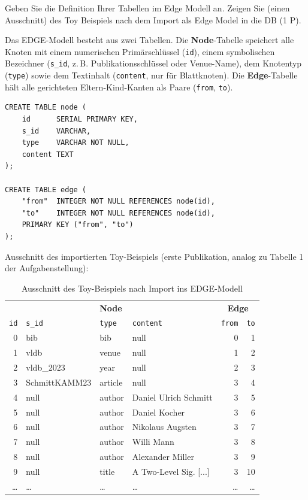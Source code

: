 \documentclass[11pt]{scrartcl}
\begin{document}
Geben Sie die Definition Ihrer Tabellen im Edge Modell an. Zeigen Sie (einen Ausschnitt) des Toy Beispiels nach dem Import als Edge Model in die DB (1 P).

Das EDGE-Modell besteht aus zwei Tabellen. Die \textbf{Node}-Tabelle speichert alle Knoten mit einem
numerischen Primärschlüssel (\texttt{id}), einem symbolischen Bezeichner (\texttt{s\_id}, z.\,B.
Publikationsschlüssel oder Venue-Name), dem Knotentyp (\texttt{type}) sowie dem Textinhalt
(\texttt{content}, nur für Blattknoten). Die \textbf{Edge}-Tabelle hält alle gerichteten Eltern-Kind-Kanten
als Paare (\texttt{from}, \texttt{to}).

\begin{lstlisting}[style=dmrsql, frame=single]
CREATE TABLE node (
    id      SERIAL PRIMARY KEY,
    s_id    VARCHAR,
    type    VARCHAR NOT NULL,
    content TEXT
);

CREATE TABLE edge (
    "from"  INTEGER NOT NULL REFERENCES node(id),
    "to"    INTEGER NOT NULL REFERENCES node(id),
    PRIMARY KEY ("from", "to")
);
\end{lstlisting}

Ausschnitt des importierten Toy-Beispiels (erste Publikation, analog zu Tabelle 1 der Aufgabenstellung):

\begin{table}[H]
\centering
\begin{tabular}{r l l l | r r}
\toprule
\multicolumn{4}{c|}{\textbf{Node}} & \multicolumn{2}{c}{\textbf{Edge}} \\
\texttt{id} & \texttt{s\_id} & \texttt{type} & \texttt{content} & \texttt{from} & \texttt{to} \\
\midrule
0 & bib            & bib          & null                  & 0 & 1 \\
1 & vldb           & venue        & null                  & 1 & 2 \\
2 & vldb\_2023     & year         & null                  & 2 & 3 \\
3 & SchmittKAMM23  & article      & null                  & 3 & 4 \\
4 & null           & author       & Daniel Ulrich Schmitt & 3 & 5 \\
5 & null           & author       & Daniel Kocher         & 3 & 6 \\
6 & null           & author       & Nikolaus Augsten      & 3 & 7 \\
7 & null           & author       & Willi Mann            & 3 & 8 \\
8 & null           & author       & Alexander Miller      & 3 & 9 \\
9 & null           & title        & A Two-Level Sig. [...] & 3 & 10 \\
\ldots & \ldots & \ldots & \ldots & \ldots & \ldots \\
\bottomrule
\end{tabular}
\caption{Ausschnitt des Toy-Beispiels nach Import ins EDGE-Modell}
\end{table}
\end{document}
